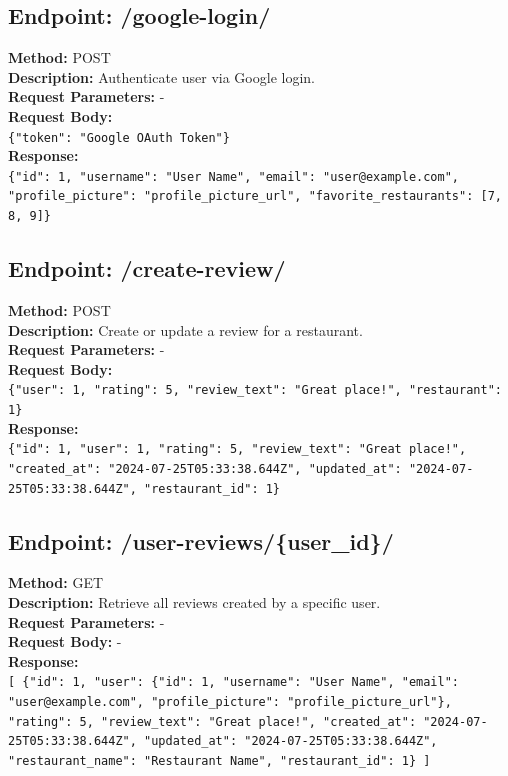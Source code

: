\documentclass[12pt, a4paper, oneside]{article}
\begin{document}
\subsection*{Endpoint: /google-login/}
\textbf{Method:} POST \\
\textbf{Description:} Authenticate user via Google login. \\
\textbf{Request Parameters:} - \\
\textbf{Request Body:} \\
\texttt{\{"token": "Google OAuth Token"\}} \\
\textbf{Response:} \\
\texttt{\{"id": 1, "username": "User Name", "email": "user@example.com", "profile\_picture": "profile\_picture\_url", "favorite\_restaurants": [7, 8, 9]\}}

\subsection*{Endpoint: /create-review/}
\textbf{Method:} POST \\
\textbf{Description:} Create or update a review for a restaurant. \\
\textbf{Request Parameters:} - \\
\textbf{Request Body:} \\
\texttt{\{"user": 1, "rating": 5, "review\_text": "Great place!", "restaurant": 1\}} \\
\textbf{Response:} \\
\texttt{\{"id": 1, "user": 1, "rating": 5, "review\_text": "Great place!", "created\_at": "2024-07-25T05:33:38.644Z", "updated\_at": "2024-07-25T05:33:38.644Z", "restaurant\_id": 1\}}

\subsection*{Endpoint: /user-reviews/\{user_id\}/}
\textbf{Method:} GET \\
\textbf{Description:} Retrieve all reviews created by a specific user. \\
\textbf{Request Parameters:} - \\
\textbf{Request Body:} - \\
\textbf{Response:} \\
\texttt{[ \{"id": 1, "user": \{"id": 1, "username": "User Name", "email": "user@example.com", "profile\_picture": "profile\_picture\_url"\}, "rating": 5, "review\_text": "Great place!", "created\_at": "2024-07-25T05:33:38.644Z", "updated\_at": "2024-07-25T05:33:38.644Z", "restaurant\_name": "Restaurant Name", "restaurant\_id": 1\} ]}
\end{document}
